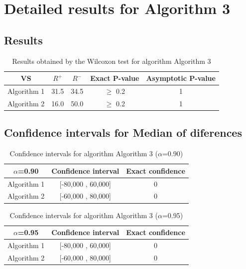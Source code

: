 \documentclass[a4paper,10pt]{article}
\begin{document}
 \clearpage 


\section{Detailed results for Algorithm 3}


\subsection{Results}

\begin{table}[!htp]
\centering\small
\begin{tabular}{
|c|c|c|c|c|}
\hline
 VS & $R^{+}$ & $R^{-}$ & Exact P-value & Asymptotic P-value \\ \hline 
Algorithm 1 & 31.5 & 34.5 & $\geq$ 0.2 & 1\\ \hline 
Algorithm 2 & 16.0 & 50.0 & $\geq$ 0.2 & 1\\ \hline 

\end{tabular}
\caption{Results obtained by the Wilcoxon test for algorithm Algorithm 3}
\end{table}

\subsection{Confidence intervals for Median of diferences}

\begin{table}[!htp]
\centering\small
\begin{tabular}{
|c|c|c|}
\hline
 $\alpha$=0.90 & Confidence interval & Exact confidence \\ \hline 
Algorithm 1 & [-80,000 , 60,000] & 0\\ \hline 
Algorithm 2 & [-60,000 , 80,000] & 0\\ \hline 

\end{tabular}
\caption{Confidence intervals for algorithm Algorithm 3 ($\alpha$=0.90)}
\end{table}
\begin{table}[!htp]
\centering\small
\begin{tabular}{
|c|c|c|}
\hline
 $\alpha$=0.95 & Confidence interval & Exact confidence \\ \hline 
Algorithm 1 & [-80,000 , 60,000] & 0\\ \hline 
Algorithm 2 & [-60,000 , 80,000] & 0\\ \hline 

\end{tabular}
\caption{Confidence intervals for algorithm Algorithm 3 ($\alpha$=0.95)}
\end{table}

 \clearpage 
\end{document}
